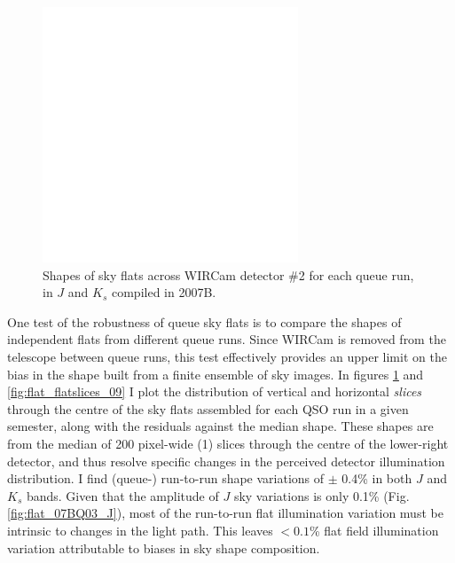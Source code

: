 \documentclass[iop]{emulateapj}
\begin{document}
\begin{figure}[t]
 \centering
     \includegraphics[width=3in]{figs/flatslices_07.pdf}
 \caption{Shapes of sky flats across WIRCam detector \#2 for each queue run, in $J$ and $K_s$ compiled in 2007B.}
 \label{fig:flat_flatslices_07}
\end{figure}


One test of the robustness of queue sky flats is to compare the shapes of independent flats from different queue runs. Since WIRCam is removed from the telescope between queue runs, this test effectively provides an upper limit on the bias in the shape built from a finite ensemble of sky images. In figures \ref{fig:flat_flatslices_07} and \ref{fig:flat_flatslices_09} I plot the distribution of vertical and horizontal \emph{slices} through the centre of the sky flats assembled for each QSO run in a given semester, along with the residuals against the median shape. These shapes are from the median of 200 pixel-wide (1\arcmin) slices through the centre of the lower-right detector, and thus resolve specific changes in the perceived detector illumination distribution. I find (queue-) run-to-run shape variations of $\pm$ 0.4\% in both $J$ and $K_s$ bands. Given that the amplitude of $J$ sky variations is only 0.1\% (Fig. \ref{fig:flat_07BQ03_J}), most of the run-to-run flat illumination variation must be intrinsic to changes in the light path. This leaves $<0.1$\% flat field illumination variation attributable to biases in sky shape composition.
\end{document}
